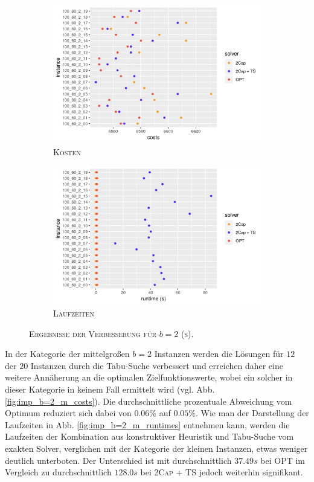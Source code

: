 \begin{figure}[H]
\centering
\begin{subfigure}[b]{0.47\textwidth}
\includegraphics[width=1.1\textwidth]{img/imp_b=2_s_costs.png}
\caption{\textsc{Kosten}}
\label{fig:imp_b=2_s_costs}
\end{subfigure}
\hfill
\begin{subfigure}[b]{0.47\textwidth}
\includegraphics[width=1.1\textwidth]{img/imp_b=2_s_runtimes.png}
\caption{\textsc{Laufzeiten}}
\label{fig:imp_b=2_s_runtimes}
\end{subfigure}
\caption{\textsc{Ergebnisse der Verbesserung für $b = 2$ (s)}.}
\label{fig:imp_res_b=2_s}
\end{figure}

In der Kategorie der mittelgroßen $b = 2$ Instanzen werden die Lösungen für $12$ der $20$ Instanzen durch
die Tabu-Suche verbessert und erreichen daher eine weitere Annäherung an die optimalen Zielfunktionswerte,
wobei ein solcher in dieser Kategorie in keinem Fall ermittelt wird (vgl. Abb. \ref{fig:imp_b=2_m_costs}).
Die durchschnittliche prozentuale Abweichung vom Optimum reduziert sich dabei von $0.06 \%$ auf $0.05 \%$.
Wie man der Darstellung der Laufzeiten in Abb. \ref{fig:imp_b=2_m_runtimes} entnehmen kann, werden die
Laufzeiten der Kombination aus konstruktiver Heuristik und Tabu-Suche vom exakten Solver, verglichen
mit der Kategorie der kleinen Instanzen, etwas weniger deutlich unterboten. Der Unterschied ist mit
durchschnittlich $37.49s$ bei \textsc{OPT} im Vergleich zu durchschnittlich $128.0s$ bei \textsc{2Cap + TS}
jedoch weiterhin signifikant.

